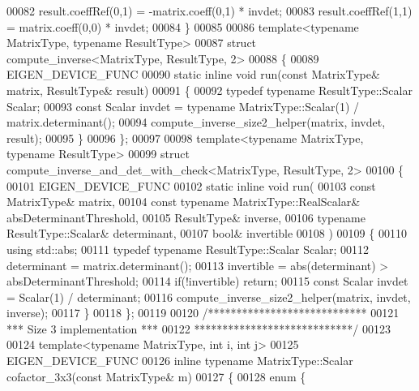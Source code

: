 \begin{DoxyCode}
00082   result.coeffRef(0,1) = -matrix.coeff(0,1) * invdet;
00083   result.coeffRef(1,1) =  matrix.coeff(0,0) * invdet;
00084 \}
00085 
00086 \textcolor{keyword}{template}<\textcolor{keyword}{typename} MatrixType, \textcolor{keyword}{typename} ResultType>
00087 \textcolor{keyword}{struct }compute\_inverse<MatrixType, ResultType, 2>
00088 \{
00089   EIGEN\_DEVICE\_FUNC
00090   \textcolor{keyword}{static} \textcolor{keyword}{inline} \textcolor{keywordtype}{void} run(\textcolor{keyword}{const} MatrixType& matrix, ResultType& result)
00091   \{
00092     \textcolor{keyword}{typedef} \textcolor{keyword}{typename} ResultType::Scalar Scalar;
00093     \textcolor{keyword}{const} Scalar invdet = \textcolor{keyword}{typename} MatrixType::Scalar(1) / matrix.determinant();
00094     compute\_inverse\_size2\_helper(matrix, invdet, result);
00095   \}
00096 \};
00097 
00098 \textcolor{keyword}{template}<\textcolor{keyword}{typename} MatrixType, \textcolor{keyword}{typename} ResultType>
00099 \textcolor{keyword}{struct }compute\_inverse\_and\_det\_with\_check<MatrixType, ResultType, 2>
00100 \{
00101   EIGEN\_DEVICE\_FUNC
00102   \textcolor{keyword}{static} \textcolor{keyword}{inline} \textcolor{keywordtype}{void} run(
00103     \textcolor{keyword}{const} MatrixType& matrix,
00104     \textcolor{keyword}{const} \textcolor{keyword}{typename} MatrixType::RealScalar& absDeterminantThreshold,
00105     ResultType& inverse,
00106     \textcolor{keyword}{typename} ResultType::Scalar& determinant,
00107     \textcolor{keywordtype}{bool}& invertible
00108   )
00109   \{
00110     \textcolor{keyword}{using} std::abs;
00111     \textcolor{keyword}{typedef} \textcolor{keyword}{typename} ResultType::Scalar Scalar;
00112     determinant = matrix.determinant();
00113     invertible = abs(determinant) > absDeterminantThreshold;
00114     \textcolor{keywordflow}{if}(!invertible) \textcolor{keywordflow}{return};
00115     \textcolor{keyword}{const} Scalar invdet = Scalar(1) / determinant;
00116     compute\_inverse\_size2\_helper(matrix, invdet, inverse);
00117   \}
00118 \};
00119 
00120 \textcolor{comment}{/****************************}
00121 \textcolor{comment}{*** Size 3 implementation ***}
00122 \textcolor{comment}{****************************/}
00123 
00124 \textcolor{keyword}{template}<\textcolor{keyword}{typename} MatrixType, \textcolor{keywordtype}{int} i, \textcolor{keywordtype}{int} j>
00125 EIGEN\_DEVICE\_FUNC 
00126 \textcolor{keyword}{inline} \textcolor{keyword}{typename} MatrixType::Scalar cofactor\_3x3(\textcolor{keyword}{const} MatrixType& m)
00127 \{
00128   \textcolor{keyword}{enum} \{

\end{DoxyCode}

